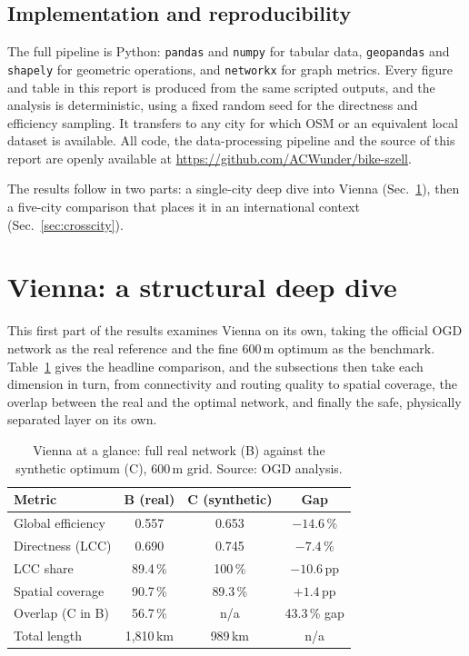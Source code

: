 \documentclass[11pt,a4paper]{article}
\begin{document}
\subsection{Implementation and reproducibility}

The full pipeline is Python: \texttt{pandas} and \texttt{numpy} for tabular data,
\texttt{geopandas} and \texttt{shapely} for geometric operations, and \texttt{networkx}
for graph metrics. Every figure and table in this report is produced from the same scripted
outputs, and the analysis is deterministic, using a fixed random seed for the directness
and efficiency sampling. It transfers to any city for which OSM or an equivalent local
dataset is available. All code, the data-processing pipeline and the source of this report
are openly available at \url{https://github.com/ACWunder/bike-szell}.

The results follow in two parts: a single-city deep dive into Vienna
(Sec.~\ref{sec:vienna}), then a five-city comparison that places it in an international
context (Sec.~\ref{sec:crosscity}).

\section{Vienna: a structural deep dive}
\label{sec:vienna}

This first part of the results examines Vienna on its own, taking the official OGD network
as the real reference and the fine 600\,m optimum as the benchmark. Table~\ref{tab:glance}
gives the headline comparison, and the subsections then take each dimension in turn, from
connectivity and routing quality to spatial coverage, the overlap between the real and the
optimal network, and finally the safe, physically separated layer on its own.

\begin{table}[t]
\centering
\caption{Vienna at a glance: full real network (B) against the synthetic optimum (C),
600\,m grid. Source: OGD analysis.}
\label{tab:glance}
\small
\begin{tabular}{lccc}
\toprule
Metric & \textbf{B} (real) & \textbf{C} (synthetic) & Gap \\
\midrule
Global efficiency      & 0.557  & 0.653  & \textcolor{red!70!black}{$-14.6\,\%$} \\
Directness (LCC)       & 0.690  & 0.745  & \textcolor{red!70!black}{$-7.4\,\%$} \\
LCC share              & 89.4\,\% & 100\,\% & \textcolor{red!70!black}{$-10.6$\,pp} \\
Spatial coverage       & 90.7\,\% & 89.3\,\% & \textcolor{green!45!black}{$+1.4$\,pp} \\
Overlap (C in B)       & 56.7\,\% & n/a & 43.3\,\% gap \\
Total length           & 1{,}810\,km & 989\,km & n/a \\
\bottomrule
\end{tabular}
\end{table}
\end{document}
